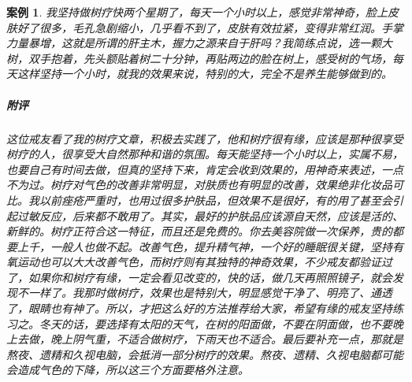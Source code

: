 \documentclass{ctexart}
\newtheorem{case}{案例}
\begin{document}
\begin{case}
    我坚持做树疗快两个星期了，每天一个小时以上，感觉非常神奇，脸上皮肤好了很多，毛孔急剧缩小，几乎看不到了，皮肤有效拉紧，变得非常红润。手掌力量暴增，这就是所谓的肝主木，握力之源来自于肝吗？我简练点说，选一颗大树，双手抱着，先头额贴着树二十分钟，再贴两边的脸在树上，感受树的气场，每天这样坚持一个小时，就我的效果来说，特别的大，完全不是养生能够做到的。
    \subparagraph{附评} 这位戒友看了我的树疗文章，积极去实践了，他和树疗很有缘，应该是那种很享受树疗的人，很享受大自然那种和谐的氛围。每天能坚持一个小时以上，实属不易，也要自己有时间去做，但真的坚持下来，肯定会收到效果的，用神奇来表述，一点不为过。树疗对气色的改善非常明显，对肤质也有明显的改善，效果绝非化妆品可比。我以前痤疮严重时，也用过很多护肤品，但效果不是很好，有的用了甚至会引起过敏反应，后来都不敢用了。其实，最好的护肤品应该源自天然，应该是活的、新鲜的。树疗正符合这一特征，而且还是免费的。你去美容院做一次保养，贵的都要上千，一般人也做不起。改善气色，提升精气神，一个好的睡眠很关键，坚持有氧运动也可以大大改善气色，而树疗则有其独特的神奇效果，不少戒友都验证过了，如果你和树疗有缘，一定会看见改变的，快的话，做几天再照照镜子，就会发现不一样了。我那时做树疗，效果也是特别大，明显感觉干净了、明亮了、通透了，眼睛也有神了。所以，才把这么好的方法推荐给大家，希望有缘的戒友坚持练习之。冬天的话，要选择有太阳的天气，在树的阳面做，不要在阴面做，也不要晚上去做，晚上阴气重，不适合做树疗，下雨天也不适合。最后要补充一点，那就是熬夜、遗精和久视电脑，会抵消一部分树疗的效果。熬夜、遗精、久视电脑都可能会造成气色的下降，所以这三个方面要格外注意。
\end{case}
\end{document}
